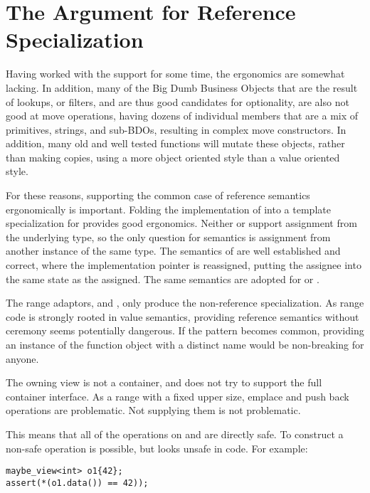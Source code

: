 \documentclass[a4paper,10pt,oneside,openany,final,article]{memoir}
\begin{document}
\section{The Argument for Reference Specialization}
Having worked with the  support for some time, the ergonomics are somewhat lacking. In addition, many of the Big Dumb Business Objects that are the result of lookups, or filters, and are thus good candidates for optionality, are also not good at move operations, having dozens of individual members that are a mix of primitives, strings, and sub-BDOs, resulting in complex move constructors. In addition, many old and well tested functions will mutate these objects, rather than making copies, using a more object oriented style than a value oriented style.

For these reasons, supporting the common case of reference semantics ergonomically is important. Folding the implementation of  into a template specialization for  provides good ergonomics. Neither  or  support assignment from the underlying type, so the only question for semantics is assignment from another instance of the same type. The semantics of  are well established and correct, where the implementation pointer is reassigned, putting the assignee into the same state as the assigned. The same semantics are adopted for  or .

The range adaptors,  and , only produce the non-reference specialization. As range code is strongly rooted in value semantics, providing reference semantics without ceremony seems potentially dangerous. If the pattern becomes common, providing an instance of the function object with a distinct name would be non-breaking for anyone.

The owning view  is not a container, and does not try to support the full container interface. As a range with a fixed upper size, emplace and push back operations are problematic. Not supplying them is not problematic.

This means that all of the operations on  and  are directly safe. To construct a non-safe operation is possible, but looks unsafe in code. For example:

\begin{minipage}[t]{\columnwidth}
  \begin{verbatim}
maybe_view<int> o1{42};
assert(*(o1.data()) == 42));
  \end{verbatim}
\end{minipage}
\end{document}
